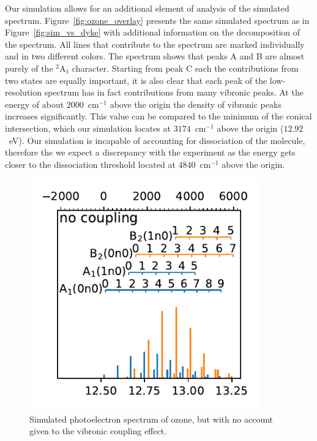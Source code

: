 \documentclass[12pt,pra,aps,superscriptaddress]{revtex4-2}
\begin{document}
Our simulation allows for an additional element of analysis of the simulated
spectrum. Figure~\ref{fig:ozone_overlay} presents the same simulated spectrum
as in Figure~\ref{fig:sim_vs_dyke} with additional information on the
decomposition of the spectrum.  All lines that contribute to the spectrum are
marked individually and in two different colors. The spectrum shows that peaks
A and B are almost purely of the $^2$A$_1$ character. Starting from peak C
each the contributions from two states are equally important, it is also clear
that each peak of the low-resolution spectrum has in fact contributions from
many vibronic peaks. At the energy of about $2000$~cm$^{-1}$ above the origin
the density of vibronic peaks increases significantly. This value can be
compared to the minimum of the conical intersection, which our simulation
locates at $3174$~cm$^{-1}$ above the origin ($12.92$~eV). Our simulation is
incapable of accounting for dissociation of the molecule, therefore the we
expect a discrepancy with the experiment as the energy gets closer to the
dissociation threshold located at $4840$~cm$^{-1}$ above the
origin.~\cite{Willitsch:O3ZEKE:2005}

\begin{figure}
    \includegraphics[width=10cm]{figures/spectrum_assigned.pdf}
    \caption{
        Simulated photoelectron spectrum of ozone, but with no account given
        to the vibronic coupling effect.
    }
    \label{fig:no_coupling}
\end{figure}
\end{document}
